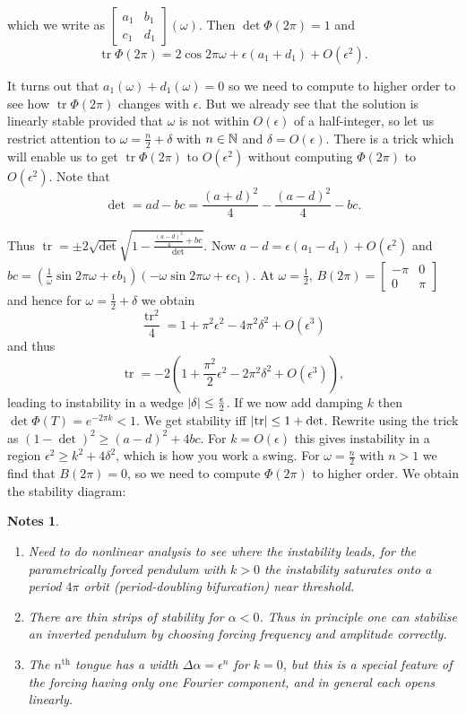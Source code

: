 \documentclass{notes}
\theoremstyle{plain}
\newtheorem*{notes}{Notes}
\DeclareMathOperator{\tr}{tr}
\begin{document}
which we write as $\begin{bmatrix} a_1 & b_1 \\ c_1 & d_1 \end{bmatrix}
(\omega)$.  Then $\det \Phi(2 \pi) = 1$ and
\[
\tr \Phi(2 \pi)
= 2 \cos 2 \pi \omega + \epsilon (a_1 + d_1) + O(\epsilon^2).
\]

It turns out that $a_1(\omega) + d_1(\omega) = 0$ so we need to compute
to higher order to see how $\tr \Phi(2 \pi)$ changes with $\epsilon$.
But we already see that the solution is linearly stable provided that
$\omega$ is not within $O(\epsilon)$ of a half-integer, so let us
restrict attention to $\omega = \frac{n}{2} + \delta$ with $n \in \mathbb{N}$
and $\delta = O(\epsilon)$.  There is a trick which will enable us
to get $\tr \Phi(2 \pi)$ to $O(\epsilon^2)$ without computing $\Phi(2 \pi)$
to $O(\epsilon^2)$.  Note that 
\[
\det = ad - bc = \frac{(a+d)^2}{4} - \frac{(a-d)^2}{4} - bc.
\]

Thus $\tr = \pm 2 \sqrt{\det} \sqrt{1 - \frac{\frac{(a-d)^2}{4} + bc}{\det}}$.
Now $a - d = \epsilon (a_1 - d_1) + O(\epsilon^2)$ and
$bc = (\frac{1}{\omega} \sin 2 \pi \omega + \epsilon b_1)
(- \omega \sin 2 \pi \omega + \epsilon c_1)$.  At $\omega = \frac{1}{2}$,
$B(2 \pi) = \begin{bmatrix} - \pi & 0 \\ 0 & \pi \end{bmatrix}$ and hence
for $\omega = \frac{1}{2} + \delta$ we obtain
\[
\frac{\tr^2}{4} = 1 + \pi^2 \epsilon^2 - 4 \pi^2  \delta^2 + O(\epsilon^3)
\]
and thus
\[
\tr = -2 ( 1 + \frac{\pi^2}{2} \epsilon^2 - 2 \pi^2 \delta^2 + O(\epsilon^3)),
\]
leading to instability in a wedge $\left|\delta\right| \le \frac{\epsilon}{2}$.
If we now add damping $k$ then $\det \Phi(T) = e^{-2 \pi k} < 1$.
We get stability iff $\abs{\tr} \le 1 + \det$.  Rewrite using the trick as
$(1-\det)^2 \ge (a-d)^2 + 4 b c$.  For $k = O(\epsilon)$ this gives
instability in a region $\epsilon^2 \ge k^2 + 4 \delta^2$, which is
how you work a swing.  For $\omega = \frac{n}{2}$ with $n > 1$ we find
that $B(2 \pi) = 0$, so we need to compute $\Phi(2 \pi)$ to higher order.
We obtain the stability diagram:

\vspace*{4in}

\begin{notes}
\begin{enumerate}
\item Need to do nonlinear analysis to see where the instability leads, for
the parametrically forced pendulum with $k > 0$ the instability saturates
onto a period $4 \pi$ orbit (period-doubling bifurcation) near threshold.
\item There are thin strips of stability for $\alpha < 0$.  Thus in principle
one can stabilise an inverted pendulum by choosing forcing frequency
and amplitude correctly.
\item The $n^{\text{th}}$ tongue has a width $\Delta \alpha = \epsilon^n$
for $k=0$, but this is a special feature of the forcing having only
one Fourier component, and in general each opens linearly.
\end{enumerate}
\end{notes}
\end{document}
